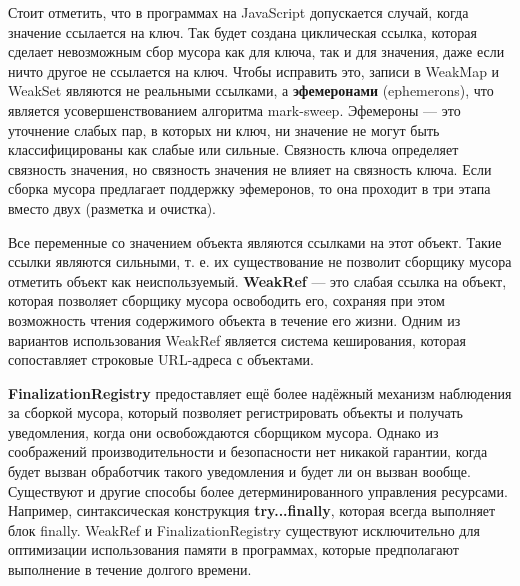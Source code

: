 Стоит отметить, что в программах на JavaScript допускается случай, когда значение ссылается на ключ. Так будет создана циклическая ссылка, которая сделает невозможным сбор мусора как для ключа, так и для значения, даже если ничто другое не ссылается на ключ. Чтобы исправить это, записи в WeakMap и WeakSet являются не реальными ссылками, а \textbf{эфемеронами} (ephemerons), что является усовершенствованием алгоритма mark-sweep. Эфемероны \cite{js_ephemerons}--- это уточнение слабых пар, в которых ни ключ, ни значение не могут быть классифицированы как слабые или сильные. Связность ключа определяет связность значения, но связность значения не влияет на связность ключа. Если сборка мусора предлагает поддержку эфемеронов, то она проходит в три этапа вместо двух (разметка и очистка). \cite{js_memory}

Все переменные со значением объекта являются ссылками на этот объект. Такие ссылки являются сильными, т. е. их существование не позволит сборщику мусора отметить объект как неиспользуемый. \textbf{WeakRef} --- это слабая ссылка на объект, которая позволяет сборщику мусора освободить его, сохраняя при этом возможность чтения содержимого объекта в течение его жизни. Одним из вариантов использования WeakRef является система кеширования, которая сопоставляет строковые URL-адреса с объектами. \cite{js_memory}

\textbf{FinalizationRegistry} предоставляет ещё более надёжный механизм наблюдения за сборкой мусора, который позволяет регистрировать объекты и получать уведомления, когда они освобождаются сборщиком мусора. Однако из соображений производительности и безопасности нет никакой гарантии, когда будет вызван обработчик такого уведомления и будет ли он вызван вообще. Существуют и другие способы более детерминированного управления ресурсами. Например, синтаксическая конструкция \textbf{try...finally}, которая всегда выполняет блок finally. WeakRef и FinalizationRegistry существуют исключительно для оптимизации использования памяти в программах, которые предполагают выполнение в течение долгого времени. \cite{js_memory}

%
%
%
%
%
%
%
%
%
%
%
%
%
%
%





